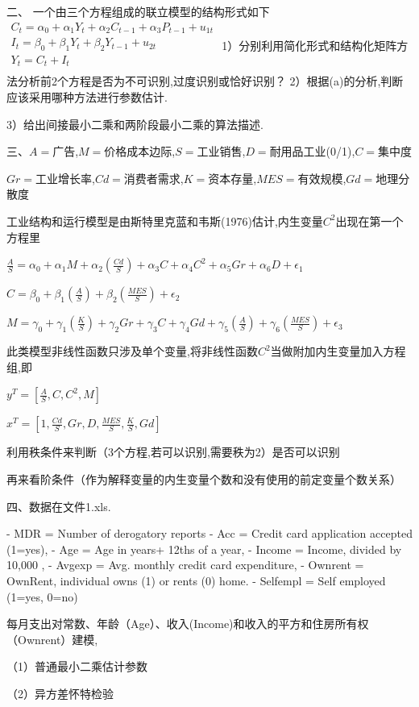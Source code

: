 二、 一个由三个方程组成的联立模型的结构形式如下
$\begin{array}{l}
C_t=\alpha_{0}+\alpha_{1}Y_t+\alpha_{2}C_{t-1}+\alpha_{3}P_{t-1}+u_{1t}\\I_t=\beta_{0}+\beta_{1}Y_t+\beta_{2}Y_{t-1}+u_{2t}\\Y_t=C_t+I_t\\\end{array}$
1）分别利用简化形式和结构化矩阵方法分析前2个方程是否为不可识别,过度识别或恰好识别？
2）根据(a)的分析,判断应该采用哪种方法进行参数估计.

3）给出间接最小二乘和两阶段最小二乘的算法描述.

三、$A=$广告,$M=$价格成本边际,$S=$工业销售,$D=$耐用品工业(0/1),$C=$集中度

$Gr=$工业增长率,$Cd=$消费者需求,$K=$资本存量,$MES=$有效规模,$Gd=$地理分散度

工业结构和运行模型是由斯特里克蓝和韦斯(1976)估计,内生变量$C^2$出现在第一个方程里

$\frac{A}{S}=\alpha_0+\alpha_1M+\alpha_2(\frac{Cd}{S})+\alpha_3C+\alpha_4C^2+\alpha_5Gr+\alpha_6D+\epsilon_1$

$C=\beta_0+\beta_1(\frac{A}{S})+\beta_2(\frac{MES}{S})+\epsilon_2$

$M=\gamma_0+\gamma_1(\frac{K}{S})+\gamma_2Gr+\gamma_3C+\gamma_4Gd+\gamma_5(\frac{A}{S})+\gamma_6(\frac{MES}{S})+\epsilon_3$

此类模型非线性函数只涉及单个变量,将非线性函数$C^2$当做附加内生变量加入方程组,即

$y^T=[\frac{A}{S},C,C^2,M]$

$x^T=[1,\frac{Cd}{S},Gr,D,\frac{MES}{S},\frac{K}{S},Gd]$

利用秩条件来判断（3个方程,若可以识别,需要秩为2）是否可以识别

再来看阶条件（作为解释变量的内生变量个数和没有使用的前定变量个数关系）

四、数据在文件1.xls.

- MDR = Number of derogatory reports
- Acc = Credit card application accepted (1=yes),
- Age = Age in years+ 12ths of a year,
- Income = Income, divided by 10,000 ,
- Avgexp = Avg. monthly credit card expenditure,
- Ownrent = OwnRent, individual owns (1) or rents (0) home.
- Selfempl = Self employed (1=yes, 0=no)

每月支出对常数、年龄（Age）、收入(Income)和收入的平方和住房所有权（Ownrent）建模,

（1）普通最小二乘估计参数

（2）异方差怀特检验

